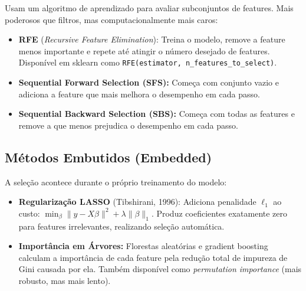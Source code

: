 \documentclass[12pt,a4paper]{article}
\begin{document}
Usam um algoritmo de aprendizado para avaliar subconjuntos de features. Mais poderosos que filtros, mas computacionalmente mais caros:

\begin{itemize}[leftmargin=*]
  \item \textbf{RFE} (\textit{Recursive Feature Elimination}): Treina o modelo, remove a feature menos importante e repete até atingir o número desejado de features. Disponível em sklearn como \texttt{RFE(estimator, n\_features\_to\_select)}.

  \item \textbf{Sequential Forward Selection (SFS):} Começa com conjunto vazio e adiciona a feature que mais melhora o desempenho em cada passo.

  \item \textbf{Sequential Backward Selection (SBS):} Começa com todas as features e remove a que menos prejudica o desempenho em cada passo.
\end{itemize}

\subsection{Métodos Embutidos (Embedded)}

A seleção acontece durante o próprio treinamento do modelo:

\begin{itemize}[leftmargin=*]
  \item \textbf{Regularização LASSO} (Tibshirani, 1996): Adiciona penalidade $\ell_1$ ao custo: $\min_\beta \|y - X\beta\|^2 + \lambda \|\beta\|_1$. Produz coeficientes exatamente zero para features irrelevantes, realizando seleção automática.

  \item \textbf{Importância em Árvores:} Florestas aleatórias e gradient boosting calculam a importância de cada feature pela redução total de impureza de Gini causada por ela. Também disponível como \textit{permutation importance} (mais robusto, mas mais lento).
\end{itemize}
\end{document}
